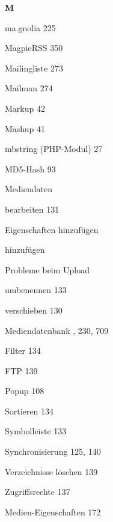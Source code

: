 \documentclass{book}
\renewcommand\indexspace{\vspace{11pt}}
\renewcommand\subitem{\par}
\begin{document}
\begin{multicols}{2}
\begin{osp-index}
  \indexspace
{\sffamily\bfseries M}\nopagebreak

  \item ma.gnolia\hspace{1mm} 225
  \item MagpieRSS\hspace{1mm} 350
  \item Mailingliste\hspace{1mm} 273
  \item Mailman\hspace{1mm} 274
  \item Markup\hspace{1mm} 42
  \item Mashup\hspace{1mm} 41
  \item mbstring (PHP-Modul)\hspace{1mm} 27
  \item MD5-Hash\hspace{1mm} 93
  \item Mediendaten
    \subitem bearbeiten\hspace{1mm} 131
    \subitem Eigenschaften hinzuf\"ugen\hspace{1mm} 
    \subitem hinzuf\"ugen\hspace{1mm} 
    \subitem Probleme beim Upload\hspace{1mm} 
    \subitem umbenennen\hspace{1mm} 133
    \subitem verschieben\hspace{1mm} 130
  \item Mediendatenbank\hspace{1mm} , 
		230, 709
    \subitem Filter\hspace{1mm} 134
    \subitem FTP\hspace{1mm} 139
    \subitem Popup\hspace{1mm} 108
    \subitem Sortieren\hspace{1mm} 134
    \subitem Symbolleiste\hspace{1mm} 133
    \subitem Synchronisierung\hspace{1mm} 125, 140
    \subitem Verzeichnisse l\"oschen\hspace{1mm} 139
    \subitem Zugriffsrechte\hspace{1mm} 137
  \item Medien-Eigenschaften\hspace{1mm} 172

\end{osp-index}
\end{multicols}
\end{document}
